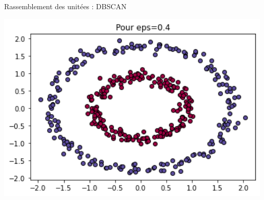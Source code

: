 \documentclass[french]{beamer}
\begin{document}
\begin{frame}{Rassemblement des unitées : DBSCAN}
\begin{minipage}{0.5\textwidth}
		\includegraphics[width=0.99\textwidth]{dbscan.png}
	\end{minipage}
\end{frame}
\end{document}
